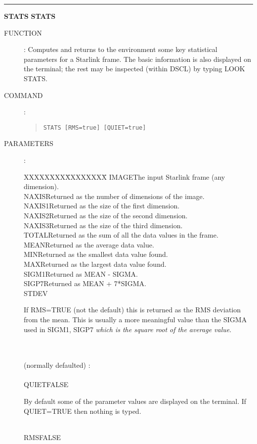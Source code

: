 \goodbreak
\rule{\textwidth}{0.3mm}
{\Large {\bf STATS} \hfill {\bf STATS}}
\begin{description}
\item [FUNCTION]:
Computes and returns to the environment some key statistical parameters for a
Starlink frame.
The basic information is also displayed on the terminal; the rest may be
inspected (within DSCL) by typing LOOK STATS.
\item [COMMAND]:
\begin{quote}
{\tt STATS  [RMS=true]  [QUIET=true]}
\end{quote}
\item [PARAMETERS] :
\begin{tabbing}
XXXXXXXX\=XXXXXXXX\=\kill
IMAGE\>\>The input Starlink frame (any dimension).\\
NAXIS\>\>Returned as the number of dimensions of the image.\\
NAXIS1\>\>Returned as the size of the first dimension.\\
NAXIS2\>\>Returned as the size of the second dimension.\\
NAXIS3\>\>Returned as the size of the third dimension.\\
TOTAL\>\>Returned as the sum of all the data values in the frame.\\
MEAN\>\>Returned as the average data value.\\
MIN\>\>Returned as the smallest data value found.\\
MAX\>\>Returned as the largest data value found.\\
SIGM1\>\>Returned as MEAN - SIGMA.\\
SIGP7\>\>Returned as MEAN + 7*SIGMA.\\
STDEV\>\>\begin{minipage}[t]{100mm}
If RMS=TRUE (not the default) this is returned as the RMS deviation from the
mean.
This is usually a more meaningful value than the SIGMA used in SIGM1, SIGP7
{\em which is the square root of the average value}.
\end{minipage}\\
\\
(normally defaulted) :\\
\\
QUIET\>FALSE\>\begin{minipage}[t]{100mm}
By default some of the parameter values are displayed on the terminal.
If QUIET=TRUE then nothing is typed.
\end{minipage}\\
RMS\>FALSE\>\begin{minipage}[t]{100mm}

\end{minipage}
\end{tabbing}
\end{description}
